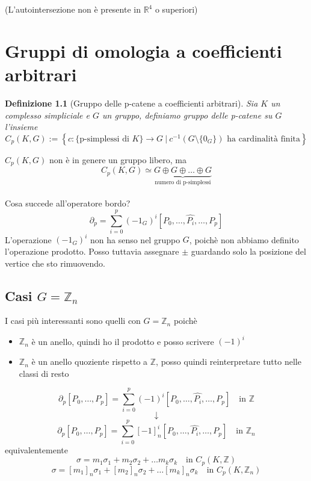 \documentclass[a4paper]{report}
\newtheorem{definition}{Definizione}
\newcommand{\Z}{\ensuremath{\mathbb{Z}}}
\newcommand{\R}{\ensuremath{\mathbb{R}}}
\newcommand{\ra}{\ensuremath{\rightarrow}}
\newcommand{\setst}[2]{\ensuremath{\left\{{#1}\ |\ {#2}\right\}}}
\begin{document}
\begin{center}

\end{center}
(L'autointersezione non è presente in $\R^4$ o superiori)
\chapter{Gruppi di omologia a coefficienti arbitrari}
\begin{definition}[Gruppo delle p-catene a coefficienti arbitrari]
    Sia $K$ un complesso simpliciale e $G$ un gruppo, definiamo gruppo delle p-catene su $G$ l'insieme
    \[
        C_p(K,G):=\setst{c:\{\text{p-simplessi di }K\}\ra G}{c^{-1}(G\setminus\{0_G\})\text{ ha cardinalità finita}}
    \]
\end{definition}
$C_p(K,G)$ non è in genere un gruppo libero, ma
\[
    C_p(K,G)\simeq \underbrace{G\oplus G\oplus\dots\oplus G}_{\text{numero di p-simplessi}}
\]
\\
Cosa succede all'operatore bordo?
\[
    \partial_p=\sum_{i=0}^p\left(-1_G\right)^i[P_0,\dots,\hat{P_i},\dots,P_p]
\]
L'operazione $(-1_G)^i$ non ha senso nel gruppo $G$, poichè non abbiamo definito l'operazione prodotto. Posso tuttavia assegnare $\pm$ guardando solo la posizione del vertice che sto rimuovendo.

\section{Casi $G=\Z_n$}
I casi più interessanti sono quelli con $G=\Z_n$ poichè
\begin{itemize}
    \item $\Z_n$ è un anello, quindi ho il prodotto e posso scrivere $(-1)^i$
    \item $\Z_n$ è un anello quoziente rispetto a $\Z$, posso quindi reinterpretare tutto nelle classi di resto
\end{itemize}
\[
    \partial_p[P_0,\dots,P_p]=\sum_{i=0}^p(-1)^i[P_0,\dots,\hat{P_i},\dots,P_p]\quad\text{in }\Z
\]
\[
    \downarrow
\]
\[
    \partial_p[P_0,\dots,P_p]=\sum_{i=0}^p[-1]^i_n[P_0,\dots,\hat{P_i},\dots,P_p]\quad\text{in }\Z_n
\]
equivalentemente
\[
    \sigma=m_1\sigma_1+m_2\sigma_2+\dots m_k\sigma_k\quad\text{in }C_p(K,\Z)
\]
\[
    \sigma=[m_1]_n\sigma_1+[m_2]_n\sigma_2+\dots [m_k]_n\sigma_k\quad\text{in }C_p(K,\Z_n)
\]
\end{document}
